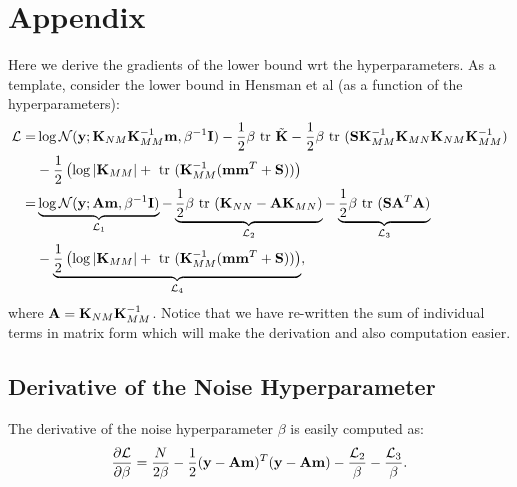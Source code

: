 \documentclass{article} %
\begin{document}
\section{Appendix}
Here we derive the gradients of the lower bound wrt the  hyperparameters.
As a template, consider the lower bound in Hensman et al (as a function of the hyperparameters):
\begin{align}
\nonumber
\mathcal{L}
=& \log \mathcal{N}(\mathbf{y}; \mathbf{K}_{NM} \mathbf{K}_{MM}^{-1} \mathbf{m}, \beta^{-1}\mathbf{I})
 - \frac{1}{2} \beta \mbox{ \rm tr } \tilde{\mathbf{K}}
 - \frac{1}{2} \beta \mbox{ \rm tr } (\mathbf{S}\mathbf{K}_{MM}^{-1} \mathbf{K}_{MN} \mathbf{K}_{NM} \mathbf{K}_{MM}^{-1}) \\  \nonumber
&- \frac{1}{2} \left( \log |\mathbf{K}_{MM}| + \mbox{ \rm tr }(\mathbf{K}_{MM}^{-1}(\mathbf{m} \mathbf{m}^T + \mathbf{S})) \right) \\ \nonumber
=& \underbrace{\log \mathcal{N}(\mathbf{y}; \mathbf{A} \mathbf{m}, \beta^{-1}\mathbf{I})}_{\mathcal{L}_1}
 - \underbrace{\frac{1}{2} \beta \mbox{ \rm tr } (\mathbf{K}_{NN} - \mathbf{A}\mathbf{K}_{MN})}_{\mathcal{L}_2}
 - \underbrace{\frac{1}{2} \beta \mbox{ \rm tr } (\mathbf{S}\mathbf{A}^T\mathbf{A})}_{\mathcal{L}_3} \\  
&- \underbrace{\frac{1}{2} \left( \log |\mathbf{K}_{MM}| + \mbox{ \rm tr }(\mathbf{K}_{MM}^{-1}(\mathbf{m} \mathbf{m}^T + \mathbf{S})) \right)}_{\mathcal{L}_4},
\end{align}
where $\mathbf{A} = \mathbf{K}_{NM} \mathbf{K}_{MM}^{-1}$.
Notice that we have re-written the sum of individual terms in matrix form which will make the derivation and also computation easier.

\subsection{Derivative of the Noise Hyperparameter}
The derivative of the noise hyperparameter $\beta$ is easily computed as:
\begin{align}
\frac{\partial{\mathcal{L}}}{\partial{\beta}} = \frac{N}{2\beta} - \frac{1}{2} (\mathbf{y} - \mathbf{A}\mathbf{m})^T (\mathbf{y} - \mathbf{A}\mathbf{m}) - \frac{\mathcal{L}_2}{\beta} - \frac{\mathcal{L}_3}{\beta}.
\end{align}
\end{document}
